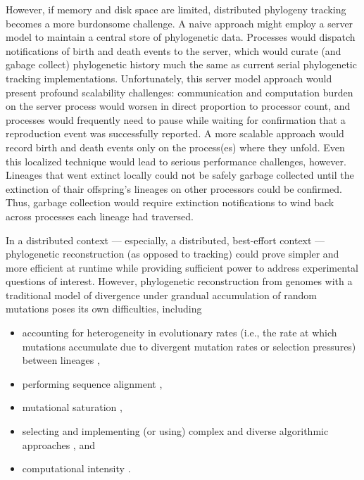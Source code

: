 However, if memory and disk space are limited, distributed phylogeny tracking becomes a more burdonsome challenge.
A naive approach might employ a server model to maintain a central store of phylogenetic data.
Processes would dispatch notifications of birth and death events to the server, which would curate (and gabage collect) phylogenetic history much the same as current serial phylogenetic tracking implementations.
Unfortunately, this server model approach would present profound scalability challenges: communication and computation burden on the server process would worsen in direct proportion to processor count, and processes would frequently need to pause while waiting for confirmation that a reproduction event was successfully reported.
A more scalable approach would record birth and death events only on the process(es) where they unfold.
Even this localized technique would lead to serious performance challenges, however. 
Lineages that went extinct locally could not be safely garbage collected until the extinction of thair offspring's lineages on other processors could be confirmed.
Thus, garbage collection would require extinction notifications to wind back across processes each lineage had traversed.


In a distributed context --- especially, a distributed, best-effort context --- phylogenetic reconstruction (as opposed to tracking) could prove simpler and more efficient at runtime while providing sufficient power to address experimental questions of interest.
However, phylogenetic reconstruction from genomes with a traditional model of divergence under grandual accumulation of random mutations poses its own difficulties, including
\begin{itemize}
\item accounting for heterogeneity in evolutionary rates (i.e., the rate at which mutations accumulate due to divergent mutation rates or selection pressures) between lineages \citep{lack2010identifying},
\item performing sequence alignment \citep{casci2008lining},
\item mutational saturation \citep{hagstrom2004using},
\item selecting and implementing (or using) complex and diverse algorithmic approaches \citep{kapli2020phylogenetic}, and
\item computational intensity \citep{sarkar2010hardware}.
\end{itemize}

